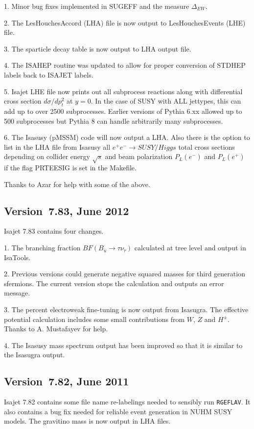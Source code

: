 1. Minor bug fixes implemented in SUGEFF and the measure $\Delta_{EW}$.

2. The LesHouchesAccord (LHA) file is now output to LesHouchesEvents (LHE) file.

3. The sparticle decay table is now output to LHA output file.

4. The ISAHEP routine was updated to allow for proper conversion
of STDHEP labels back to ISAJET labels.

5. Isajet LHE file now prints out all subprocess reactions along with differential cross
section $d\sigma/dp_t^2$ at $y=0$. In the case of SUSY with ALL jettypes, this can add up
to over 2500 subprocesses. Earlier versions of Pythia 6.xx allowed up to 500 subprocesses but
Pythia 8 can handle arbitrarily many subprocesses. 

6. The Isasusy (pMSSM) code will now output a LHA. Also there is the option to list 
in the LHA file from Isasusy all $e^+e^-\rightarrow SUSY/Higgs$ total cross sections 
depending on collider energy $\sqrt{s}$ and beam polarization $P_L(e^-)$ and $P_L(e^+)$ if
the flag PRTEESIG is set in the Makefile.

Thanks to Azar for help with some of the above.

\subsection{Version~7.83, June 2012}

Isajet 7.83 contains four changes. 

1. The branching fraction $BF(B_u\rightarrow\tau\nu_\tau )$ calculated
at tree level and output in IsaTools.

2. Previous versions could generate negative squared masses for third 
generation sfermions. The current version stops the calculation and
outputs an error message.

3. The percent electroweak fine-tuning is now output from Isasugra.
The effective potential calculation includes some small contributions from
$W$, $Z$ and $H^\pm$. Thanks to A. Mustafayev for help.

4. The Isasusy mass spectrum output has been improved so that it is similar to
the Isasugra output.

\subsection{Version~7.82, June 2011}

Isajet 7.82 contains some file name re-labelings needed to sensibly run \texttt{RGEFLAV}.
It also contains a bug fix needed for reliable event generation in NUHM SUSY models.
The gravitino mass is now output in LHA files.

